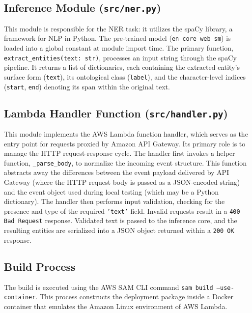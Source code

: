 \documentclass[11pt,a4paper]{article}
\begin{document}
\subsection{Inference Module (\texttt{src/ner.py})}
This module is responsible for the NER task: it utilizes the spaCy library, a framework for NLP in Python. The pre-trained model (\texttt{en\_core\_web\_sm}) is loaded into a global constant at module import time. The primary function, \texttt{extract\_entities(text: str)}, processes an input string through the spaCy pipeline. It returns a list of dictionaries, each containing the extracted entity's surface form (\texttt{text}), its ontological class (\texttt{label}), and the character-level indices (\texttt{start}, \texttt{end}) denoting its span within the original text.

\subsection{Lambda Handler Function (\texttt{src/handler.py})}
This module implements the AWS Lambda function handler, which serves as the entry point for requests proxied by Amazon API Gateway. Its primary role is to manage the HTTP request-response cycle. The handler first invokes a helper function, \texttt{\_parse\_body}, to normalize the incoming event structure. This function abstracts away the differences between the event payload delivered by API Gateway (where the HTTP request body is passed as a JSON-encoded string) and the event object used during local testing (which may be a Python dictionary). The handler then performs input validation, checking for the presence and type of the required \texttt{'text'} field. Invalid requests result in a \texttt{400 Bad Request} response. Validated text is passed to the inference core, and the resulting entities are serialized into a JSON object returned within a \texttt{200 OK} response.

\subsection{Build Process}
The build is executed using the AWS SAM CLI command \texttt{sam build --use-container}. This process constructs the deployment package inside a Docker container that emulates the Amazon Linux environment of AWS Lambda.
\end{document}
